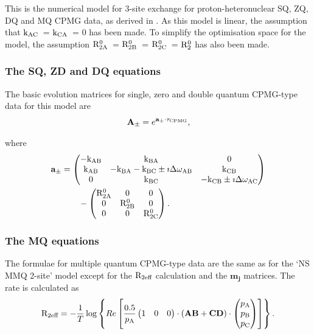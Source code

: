This is the numerical model for 3-site exchange for proton-heteronuclear SQ, ZQ, DQ and MQ CPMG data, as derived in \citep{Korzhnev04a,Korzhnev04b,Korzhnev05}.
As this model is linear, the assumption that $\textrm{k}_\textrm{AC}$~= $\textrm{k}_\textrm{CA}$~= 0 has been made.
To simplify the optimisation space for the model, the assumption $\mathrm{R}_\mathrm{2A}^0$~= $\mathrm{R}_\mathrm{2B}^0$~= $\mathrm{R}_\mathrm{2C}^0$~= $\mathrm{R}_2^0$ has also been made.


\subsubsection{The SQ, ZD and DQ equations}

The basic evolution matrices for single, zero and double quantum CPMG-type data for this model are
\begin{equation}
    \mathbf{A_\pm} = e^{\mathbf{a_\pm} \cdot \tau_\textrm{CPMG}},
\end{equation}

where
\begin{align}
    \mathbf{a_\pm} &= \begin{pmatrix}
                        -\textrm{k}_\textrm{AB} & \textrm{k}_\textrm{BA}                          & 0    \\
                        \textrm{k}_\textrm{AB}  & -\textrm{k}_\textrm{BA} -\textrm{k}_\textrm{BC} \pm\imath\Delta\omega_\textrm{AB}    & \textrm{k}_\textrm{CB} \\
                        0     & \textrm{k}_\textrm{BC}                          & -\textrm{k}_\textrm{CB} \pm\imath\Delta\omega_\textrm{AC}
                      \end{pmatrix}  \nonumber \\
                   &\qquad - \begin{pmatrix}
                               \mathrm{R}_\mathrm{2A}^0 & 0          & 0    \\
                               0          & \mathrm{R}_\mathrm{2B}^0 & 0    \\
                               0          & 0          & \mathrm{R}_\mathrm{2C}^0
                             \end{pmatrix}.
\end{align}


\subsubsection{The MQ equations}

The formulae for multiple quantum CPMG-type data are the same as for the `NS MMQ 2-site' model except for the $\mathrm{R}_\textrm{2eff}$ calculation and the $\mathbf{m_j}$ matrices.
The rate is calculated as
\begin{equation}
    \mathrm{R}_\textrm{2eff} = - \frac{1}{T}
                 \log \left\{ Re \left[ \frac{0.5}{p_\textrm{A}}
                     \begin{pmatrix}1&0&0\end{pmatrix} \cdot \left( \mathbf{AB} + \mathbf{CD} \right) \cdot \begin{pmatrix}p_\textrm{A}\\p_\textrm{B}\\p_\textrm{C}\end{pmatrix}
                 \right] \right\}.
\end{equation}

